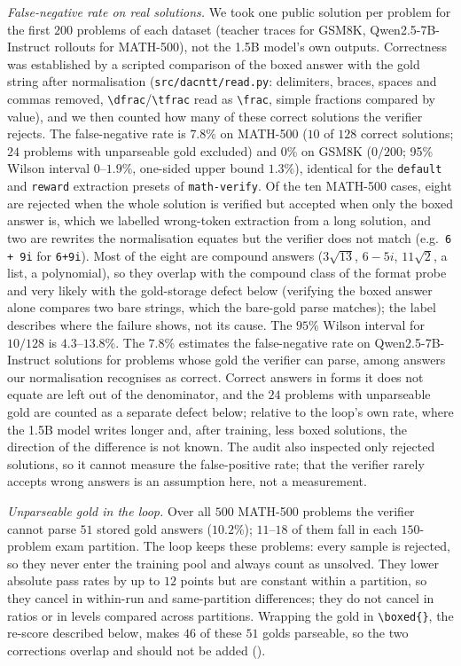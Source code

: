 \documentclass[runningheads]{llncs}
\begin{document}
\emph{False-negative rate on real solutions.} We took one public solution per
problem for the first $200$ problems of each dataset (teacher traces for GSM8K,
Qwen2.5-7B-Instruct rollouts for MATH-500), not the 1.5B model's own outputs.
Correctness was established by a scripted comparison of the boxed answer with
the gold string after normalisation (\texttt{src/dacntt/read.py}: delimiters,
braces, spaces and commas removed, \verb|\dfrac|/\verb|\tfrac| read as
\verb|\frac|, simple fractions compared by value), and we then counted how many of
these correct solutions the verifier rejects. The false-negative rate is
$7.8\%$ on MATH-500 ($10$ of $128$ correct solutions; $24$ problems with
unparseable gold excluded) and $0\%$ on GSM8K ($0/200$; 95\% Wilson interval
$0$--$1.9\%$, one-sided upper bound $1.3\%$), identical for the \texttt{default}
and \texttt{reward} extraction presets of \texttt{math-verify}. Of the ten
MATH-500 cases, eight are rejected when the whole solution is verified but
accepted when only the boxed answer is, which we labelled wrong-token
extraction from a long solution, and two are rewrites the normalisation
equates but the verifier does not match (e.g.\ \verb|6 + 9i| for \verb|6+9i|).
Most of the eight are compound answers ($3\sqrt{13}$, $6-5i$, $11\sqrt2$, a
list, a polynomial), so they overlap with the compound class of the format
probe and very likely with the gold-storage defect below (verifying the boxed
answer alone compares two bare strings, which the bare-gold parse matches);
the label describes where the failure shows, not its cause. The $95\%$ Wilson
interval for $10/128$ is $4.3$--$13.8\%$.
The $7.8\%$ estimates the false-negative rate on Qwen2.5-7B-Instruct solutions
for problems whose gold the verifier can parse, among answers our normalisation
recognises as correct. Correct answers in forms it does not equate are left out
of the denominator, and the $24$ problems with unparseable gold are counted as a
separate defect below; relative to the loop's own rate, where the 1.5B model
writes longer and, after training, less boxed solutions, the direction of the
difference is not known. The audit also inspected only rejected solutions, so it cannot measure
the false-positive rate; that the verifier rarely accepts wrong answers is an
assumption here, not a measurement.

\emph{Unparseable gold in the loop.} Over all $500$ MATH-500 problems the
verifier cannot parse $51$ stored gold answers ($10.2\%$); $11$--$18$ of them fall
in each $150$-problem exam partition. The loop keeps these problems: every
sample is rejected, so they never enter the training pool and always count as
unsolved. They lower absolute pass rates by up to $12$ points but are constant
within a partition, so they cancel in within-run and same-partition
differences; they do not cancel in ratios or in levels compared across
partitions. Wrapping the gold in \verb|\boxed{}|, the re-score described
below, makes $46$ of these $51$ golds parseable, so the two corrections overlap
and should not be added ().
\end{document}
